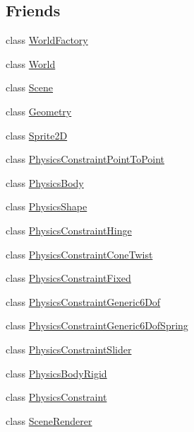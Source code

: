 \subsection*{Friends}
\begin{DoxyCompactItemize}
\item 
class \mbox{\hyperlink{classnjli_1_1_node_acb96ebb09abe8f2a37a915a842babfac}{World\+Factory}}
\item 
class \mbox{\hyperlink{classnjli_1_1_node_a7b4bcdf992c21ae83363f25df05b1d25}{World}}
\item 
class \mbox{\hyperlink{classnjli_1_1_node_a032858ae1fe02d2d1170981c2af2d67c}{Scene}}
\item 
class \mbox{\hyperlink{classnjli_1_1_node_a9aca7b7350e6ffa0e2d6320834ad1857}{Geometry}}
\item 
class \mbox{\hyperlink{classnjli_1_1_node_ac1e5ab02d2359e991783010c562791e4}{Sprite2D}}
\item 
class \mbox{\hyperlink{classnjli_1_1_node_a06afcd7f1b1822af8e15e045e77eed2a}{Physics\+Constraint\+Point\+To\+Point}}
\item 
class \mbox{\hyperlink{classnjli_1_1_node_a5602338bf4d8e0e6baa58d3daa8dc90a}{Physics\+Body}}
\item 
class \mbox{\hyperlink{classnjli_1_1_node_a726223aef7972f289c4a01ccfd23d5ee}{Physics\+Shape}}
\item 
class \mbox{\hyperlink{classnjli_1_1_node_a0117dac2d3ca1ac4ebe089ac8c258560}{Physics\+Constraint\+Hinge}}
\item 
class \mbox{\hyperlink{classnjli_1_1_node_a2ccf10571ac5c97189a4c7d1fe3831ae}{Physics\+Constraint\+Cone\+Twist}}
\item 
class \mbox{\hyperlink{classnjli_1_1_node_a684f5ece6d7d44c2b9f689e76458a8fb}{Physics\+Constraint\+Fixed}}
\item 
class \mbox{\hyperlink{classnjli_1_1_node_a1d2185bf07a23cc48cd8f9d4271f3e39}{Physics\+Constraint\+Generic6\+Dof}}
\item 
class \mbox{\hyperlink{classnjli_1_1_node_af32c447e4cf588410ecc1a6106157f9a}{Physics\+Constraint\+Generic6\+Dof\+Spring}}
\item 
class \mbox{\hyperlink{classnjli_1_1_node_a6b9fa11eb22d1cb30e2d4fc2247e9afa}{Physics\+Constraint\+Slider}}
\item 
class \mbox{\hyperlink{classnjli_1_1_node_ada345e4f9c2a87f06868b74d30e94ad2}{Physics\+Body\+Rigid}}
\item 
class \mbox{\hyperlink{classnjli_1_1_node_aa59c958a66870f0d251ec0dd477d2eff}{Physics\+Constraint}}
\item 
class \mbox{\hyperlink{classnjli_1_1_node_aae6efa51fde36cf2c0759009ba7b19c0}{Scene\+Renderer}}
\end{DoxyCompactItemize}


